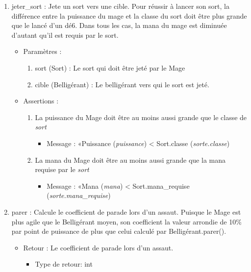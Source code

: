 \documentclass[12pt,pdftex,oneside]{article}
\begin{document}
\begin{itemize}
    \begin{enumerate}
    \item jeter\_sort : Jete un sort vers une cible. Pour réussir à lancer son sort, la
      différence entre la puissance du mage et la classe du sort doit être plus
      grande que le lancé d'un dé6. Dans tous les cas, la mana du mage est diminuée d'autant qu'il est requis par le sort.
      \begin{itemize}
      \item Paramètres : 
        \begin{enumerate}
        \item sort (Sort) : Le sort qui doit être jeté par le Mage
        \item cible (Belligérant) : Le belligérant vers qui le sort est jeté.
        \end{enumerate}
      \item Assertions : 
        \begin{enumerate}
        \item La puissance du Mage doit être au moins aussi grande que le classe
          de \emph{sort}
          \begin{itemize}
          \item Message : «Puissance (\emph{puissance}) < Sort.classe
            (\emph{sorte.classe})        
          \end{itemize}
        \item La mana du Mage doit être au moins aussi grande que la mana requise
          par le \emph{sort}
          \begin{itemize}
          \item Message : «Mana (\emph{mana}) < Sort.mana\_requise (\emph{sorte.mana\_requise})
          \end{itemize}
        \end{enumerate}
      \end{itemize}

    \item parer : Calcule le coefficient de parade lors d'un assaut. Puisque le
      Mage est plus agile que le Belligérant moyen, son coefficient la valeur arrondie de 10\% par
      point de puissance de plus que celui calculé par Belligérant.parer().
      \begin{itemize}
      \item Retour : Le coefficient de parade lors d'un assaut.
          \begin{itemize}
          \item Type de retour: int
          \end{itemize}
      \end{itemize}


\end{enumerate}
\end{itemize}
\end{document}
